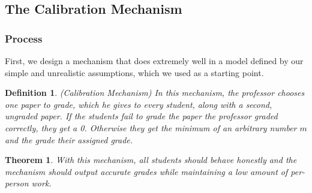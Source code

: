 \documentclass[12pt, Arial]{article}
\newtheorem{theorem}{Theorem}
\newtheorem{definition}{Definition}
\begin{document}
\subsection{The Calibration Mechanism}
\label{sec:calibration}

\subsubsection{Process}
First, we design a mechanism that does extremely well in a model defined by our simple and unrealistic assumptions, which we used as a starting point.
\begin{definition}(Calibration Mechanism)
In this mechanism, the professor chooses one paper to grade, which he gives to every student, along with a second, ungraded paper. If the students fail to grade the paper the professor graded correctly, they get a 0. Otherwise they get the minimum of an arbitrary number $m$ and the grade their assigned grade.
\end{definition}
\begin{theorem}
With this mechanism, all students should behave honestly and the mechanism should output accurate grades while maintaining a low amount of per-person work.
\end{theorem}
\end{document}
